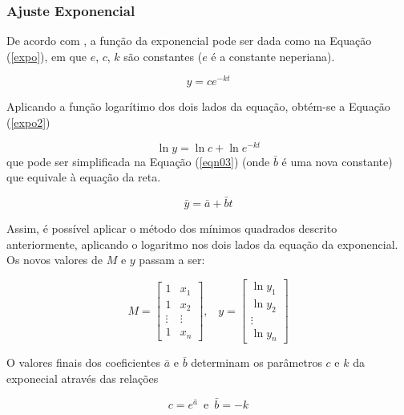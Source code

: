 {	\subsubsection{Ajuste Exponencial}

	De acordo com \cite{calculo}, a função da exponencial pode ser dada como na Equação (\ref{expo}), em que $e$, $c$, $k$ são constantes ($e$ é a constante neperiana).  

	\begin{equation}
	\label{expo}
		y = ce^{-kt}
	\end{equation}

	Aplicando a função logarítimo dos dois lados da equação, obtém-se a  Equação (\ref{expo2})

	\begin{equation}
	\label{expo2}
		\ln{y} = \ln{c}  + \ln{e^{-kt}}
	\end{equation}
 	que pode ser simplificada na  Equação (\ref{eqn03}) (onde $\bar{b}$ é uma nova constante) que equivale à equação da reta. 

	\begin{equation}
	\label{eqn03}
		\bar{y} = \bar{a} + \bar{b}t
	\end{equation}	

	Assim, é possível aplicar o método dos mínimos quadrados descrito anteriormente, aplicando o logaritmo nos dois lados da equação da exponencial. Os novos valores de $M$ e $y$ passam a ser: 

	\begin{equation}
	M = \left[\begin{array}{cc}
               	1 &  x_{1} \\
               	1 & x_{2}  \\
		\vdots & \vdots  \\
		1 & x_{n}
          	         \end{array}\right] \mbox{,} \quad
	y = \left[\begin{array}{c}
               	\ln{y_{1}} \\
               	\ln{y_{2}}  \\
		\vdots \\
		\ln{y_{n}}
          	         \end{array}\right] 
	\label{nvar}
	\end{equation}

	O valores finais dos coeficientes $\bar{a}$ e $\bar{b}$ determinam os parâmetros $c$ e $k$ da exponecial através das relações

	\begin{equation}
	c = e^{\bar{a}}\, \, \, \mbox{e}\, \, \,\bar{b} = -k
	\end{equation} 

}

